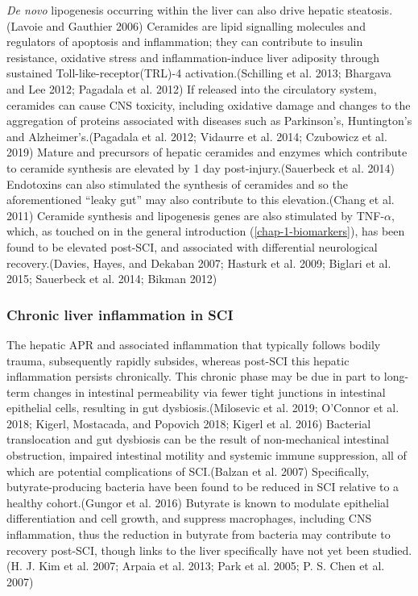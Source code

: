 \documentclass[9pt,lineno]{elife}
\begin{document}
\emph{De novo} lipogenesis occurring within the liver can also drive hepatic steatosis.(Lavoie and Gauthier 2006)
Ceramides are lipid signalling molecules and regulators of apoptosis and inflammation; they can contribute to insulin resistance, oxidative stress and inflammation-induce liver adiposity through sustained Toll-like-receptor(TRL)-4 activation.(Schilling et al. 2013; Bhargava and Lee 2012; Pagadala et al. 2012)
If released into the circulatory system, ceramides can cause CNS toxicity, including oxidative damage and changes to the aggregation of proteins associated with diseases such as Parkinson's, Huntington's and Alzheimer's.(Pagadala et al. 2012; Vidaurre et al. 2014; Czubowicz et al. 2019)
Mature and precursors of hepatic ceramides and enzymes which contribute to ceramide synthesis are elevated by 1 day post-injury.(Sauerbeck et al. 2014)
Endotoxins can also stimulated the synthesis of ceramides and so the aforementioned ``leaky gut'' may also contribute to this elevation.(Chang et al. 2011)
Ceramide synthesis and lipogenesis genes are also stimulated by TNF-\(\alpha\), which, as touched on in the general introduction (\ref{chap-1-biomarkers}), has been found to be elevated post-SCI, and associated with differential neurological recovery.(Davies, Hayes, and Dekaban 2007; Hasturk et al. 2009; Biglari et al. 2015; Sauerbeck et al. 2014; Bikman 2012)

\hypertarget{chronic-liver-inflammation-in-sci}{%
\subsubsection{Chronic liver inflammation in SCI}\label{chronic-liver-inflammation-in-sci}}

The hepatic APR and associated inflammation that typically follows bodily trauma, subsequently rapidly subsides, whereas post-SCI this hepatic inflammation persists chronically.
This chronic phase may be due in part to long-term changes in intestinal permeability via fewer tight junctions in intestinal epithelial cells, resulting in gut dysbiosis.(Milosevic et al. 2019; O'Connor et al. 2018; Kigerl, Mostacada, and Popovich 2018; Kigerl et al. 2016)
Bacterial translocation and gut dysbiosis can be the result of non-mechanical intestinal obstruction, impaired intestinal motility and systemic immune suppression, all of which are potential complications of SCI.(Balzan et al. 2007)
Specifically, butyrate-producing bacteria have been found to be reduced in SCI relative to a healthy cohort.(Gungor et al. 2016)
Butyrate is known to modulate epithelial differentiation and cell growth, and suppress macrophages, including CNS inflammation, thus the reduction in butyrate from bacteria may contribute to recovery post-SCI, though links to the liver specifically have not yet been studied.(H. J. Kim et al. 2007; Arpaia et al. 2013; Park et al. 2005; P. S. Chen et al. 2007)
\end{document}
